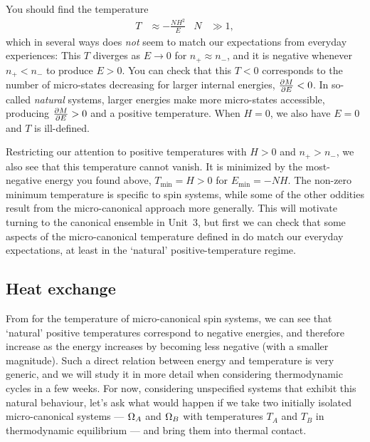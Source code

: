 You should find the temperature
\begin{align}
  \label{eq:spin_temp}
  T & \approx -\frac{NH^2}{E} &
  N & \gg 1,
\end{align}
which in several ways does \textit{not} seem to match our expectations from everyday experiences: This $T$ diverges as $E \to 0$ for $n_+ \approx n_-$, and it is negative whenever $n_+ < n_-$ to produce $E > 0$.
You can check that this $T < 0$ corresponds to the number of micro-states decreasing for larger internal energies, $\frac{\partial M}{\partial E} < 0$.
In so-called \textit{natural} systems, larger energies make more micro-states accessible, producing $\frac{\partial M}{\partial E} > 0$ and a positive temperature. %
When $H = 0$, we also have $E = 0$ and $T$ is ill-defined.

Restricting our attention to positive temperatures with $H > 0$ and $n_+ > n_-$, we also see that this temperature cannot vanish.
It is minimized by the most-negative energy you found above, $T_{\text{min}} = H > 0$ for $E_{\text{min}} = -NH$.
The non-zero minimum temperature is specific to spin systems, while some of the other oddities result from the micro-canonical approach more generally.
This will motivate turning to the canonical ensemble in Unit~3, but first we can check that some aspects of the micro-canonical temperature defined in  do match our everyday expectations, at least in the `natural' positive-temperature regime.



\subsection{\label{sec:heat_ex}Heat exchange}
From  for the temperature of micro-canonical spin systems, we can see that `natural' positive temperatures correspond to negative energies, and therefore increase as the energy increases by becoming less negative (with a smaller magnitude).
Such a direct relation between energy and temperature is very generic, and we will study it in more detail when considering thermodynamic cycles in a few weeks.
For now, considering unspecified systems that exhibit this natural behaviour, let's ask what would happen if we take two initially isolated micro-canonical systems --- $\Omega_A$ and $\Omega_B$ with temperatures $T_A$ and $T_B$ in thermodynamic equilibrium --- and bring them into thermal contact.

